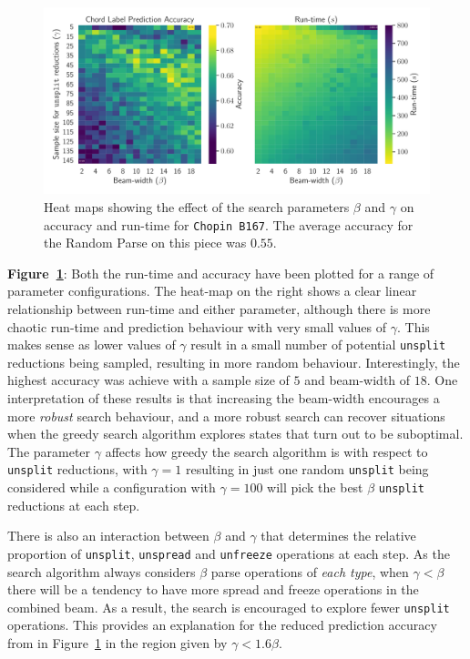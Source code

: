 \documentclass[12pt,a4paper,twoside,openany]{report} \usepackage[pdfborder={0 0 0}]{hyperref}    %
\theoremstyle{definition} \newtheorem{definition}{Definition}[section]
\begin{document}
  \begin{figure}[ht]
    \begin{center}
      \includegraphics[width=\textwidth]{figs/eval/Extension/extParamsAccuracyRuntime.pdf}
    \end{center}
    \caption{Heat maps showing the effect of the search parameters $\beta$ and $\gamma$ on accuracy and run-time for
    \texttt{Chopin B167}. The average accuracy for the Random Parse on this piece was $0.55$.}
    \label{fig:extParamsAccRun}
  \end{figure}

\textbf{Figure~\ref{fig:extParamsAccRun}}: Both the run-time and accuracy have been plotted for a range of parameter
configurations. The heat-map on the right shows a clear linear relationship between run-time and either parameter,
although there is more chaotic run-time and prediction behaviour with very small values of $\gamma$. This makes sense as
lower values of $\gamma$ result in a small number of potential \texttt{unsplit} reductions being sampled, resulting in more random
behaviour. Interestingly, the highest accuracy was achieve with a sample size of $5$ and beam-width of $18$. One 
interpretation of these results is that increasing the beam-width encourages a more \textit{robust} search behaviour, and a more
robust search can recover situations when the greedy search algorithm explores states that turn out to be suboptimal.
The parameter $\gamma$ affects how greedy the search algorithm is with respect to \texttt{unsplit} reductions, with
$\gamma=1$ resulting in just one random \texttt{unsplit} being considered while a configuration with $\gamma=100$ will
pick the best $\beta$ \texttt{unsplit} reductions at each step. 

There is also an interaction between $\beta$ and
$\gamma$ that determines the relative proportion of \texttt{unsplit}, \texttt{unspread} and \texttt{unfreeze} operations
at each step. As the search algorithm always considers $\beta$ parse operations of \textit{each type}, when $\gamma
< \beta$ there will be a tendency to have more spread and freeze operations in the combined beam. As a result, the
search is encouraged to explore fewer \texttt{unsplit} operations. This provides an explanation for the reduced
prediction accuracy from in Figure~\ref{fig:extParamsAccRun} in the region given by $\gamma < 1.6 \beta$.
\end{document}
